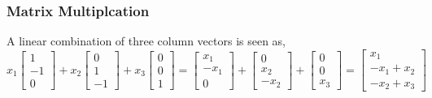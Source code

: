         \subsubsection{Matrix Multiplcation}
            A linear combination of three column vectors is seen as, 
            \begin{equation}
                x_1
                \begin{bmatrix}
                    1 \\
                    -1 \\
                    0
                \end{bmatrix}
                +
                x_2
                \begin{bmatrix}
                    0 \\
                    1 \\
                    -1
                \end{bmatrix}
                +
                x_3
                \begin{bmatrix}
                    0 \\
                    0 \\
                    1
                \end{bmatrix}
                =
                \begin{bmatrix}
                    x_1 \\
                    -x_1 \\
                    0
                \end{bmatrix}
                +
                \begin{bmatrix}
                    0 \\
                    x_2 \\
                    -x_2
                \end{bmatrix}
                +
                \begin{bmatrix}
                    0 \\
                    0 \\
                    x_3
                \end{bmatrix}
                =
                \begin{bmatrix}
                    x_1 \\
                    -x_1 + x_2\\
                    -x_2 + x_3
                \end{bmatrix}
            \end{equation}
